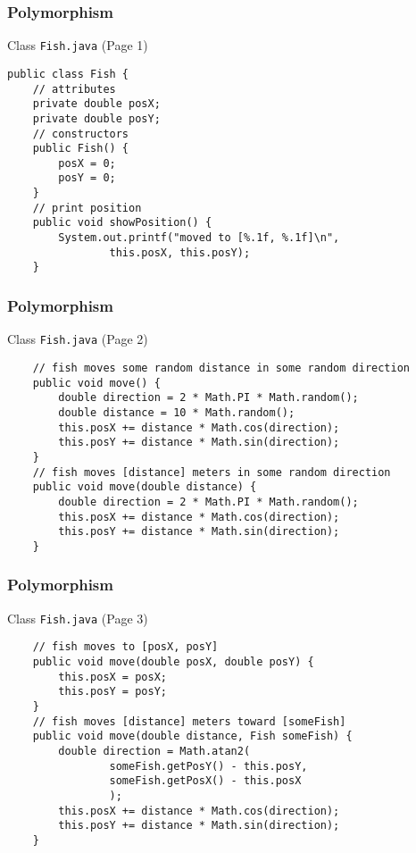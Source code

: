 \documentclass[10pt, compress]{beamer}
\begin{document}
\begin{frame}[fragile]
	\frametitle{Polymorphism}
	\begin{block}{Class \texttt{Fish.java} (Page 1)}
		\begin{verbatim}
public class Fish {
	// attributes
	private double posX;
	private double posY;
	// constructors
	public Fish() {
		posX = 0;
		posY = 0;
	}
	// print position
	public void showPosition() {
		System.out.printf("moved to [%.1f, %.1f]\n",
				this.posX, this.posY);
	}
		\end{verbatim}
	\end{block}
\end{frame}

\begin{frame}[fragile]
	\frametitle{Polymorphism}
	\begin{block}{Class \texttt{Fish.java} (Page 2)}
		\begin{verbatim}
	// fish moves some random distance in some random direction
	public void move() {
		double direction = 2 * Math.PI * Math.random();
		double distance = 10 * Math.random();
		this.posX += distance * Math.cos(direction);
		this.posY += distance * Math.sin(direction);
	}
	// fish moves [distance] meters in some random direction
	public void move(double distance) {
		double direction = 2 * Math.PI * Math.random();
		this.posX += distance * Math.cos(direction);
		this.posY += distance * Math.sin(direction);
	}
		\end{verbatim}
	\end{block}
\end{frame}

\begin{frame}[fragile]
	\frametitle{Polymorphism}
	\begin{block}{Class \texttt{Fish.java} (Page 3)}
		\begin{verbatim}
	// fish moves to [posX, posY]
	public void move(double posX, double posY) {
		this.posX = posX;
		this.posY = posY;
	}
	// fish moves [distance] meters toward [someFish]
	public void move(double distance, Fish someFish) {
		double direction = Math.atan2(
				someFish.getPosY() - this.posY,
				someFish.getPosX() - this.posX
				);
		this.posX += distance * Math.cos(direction);
		this.posY += distance * Math.sin(direction);
	}
		\end{verbatim}
	\end{block}
\end{frame}
\end{document}
